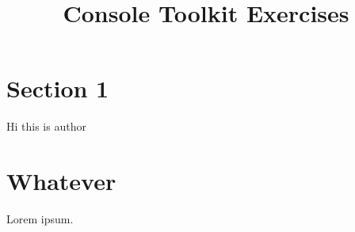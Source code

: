 \documentclass{TheAlternativeCourse}
\title{Console Toolkit Exercises}
\date{}
\begin{document}
\maketitle

\section{Section 1}

Hi this is author

\section{Whatever}

Lorem ipsum.
\end{document}
